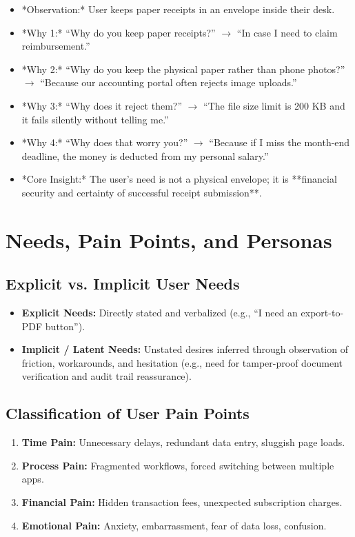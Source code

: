 \begin{example}
\begin{itemize}[leftmargin=1.2em, itemsep=2pt]
    \item *Observation:* User keeps paper receipts in an envelope inside their desk.
    \item *Why 1:* ``Why do you keep paper receipts?'' $\rightarrow$ ``In case I need to claim reimbursement.''
    \item *Why 2:* ``Why do you keep the physical paper rather than phone photos?'' $\rightarrow$ ``Because our accounting portal often rejects image uploads.''
    \item *Why 3:* ``Why does it reject them?'' $\rightarrow$ ``The file size limit is 200 KB and it fails silently without telling me.''
    \item *Why 4:* ``Why does that worry you?'' $\rightarrow$ ``Because if I miss the month-end deadline, the money is deducted from my personal salary.''
    \item *Core Insight:* The user's need is not a physical envelope; it is **financial security and certainty of successful receipt submission**.
\end{itemize}
\end{example}

\section{Needs, Pain Points, and Personas}

\subsection{Explicit vs. Implicit User Needs}
\begin{itemize}[leftmargin=1.2em, itemsep=3pt]
    \item \textbf{Explicit Needs:} Directly stated and verbalized (e.g., ``I need an export-to-PDF button'').
    \item \textbf{Implicit / Latent Needs:} Unstated desires inferred through observation of friction, workarounds, and hesitation (e.g., need for tamper-proof document verification and audit trail reassurance).
\end{itemize}

\subsection{Classification of User Pain Points}
\begin{enumerate}[leftmargin=1.2em, itemsep=2pt]
    \item \textbf{Time Pain:} Unnecessary delays, redundant data entry, sluggish page loads.
    \item \textbf{Process Pain:} Fragmented workflows, forced switching between multiple apps.
    \item \textbf{Financial Pain:} Hidden transaction fees, unexpected subscription charges.
    \item \textbf{Emotional Pain:} Anxiety, embarrassment, fear of data loss, confusion.
\end{enumerate}

